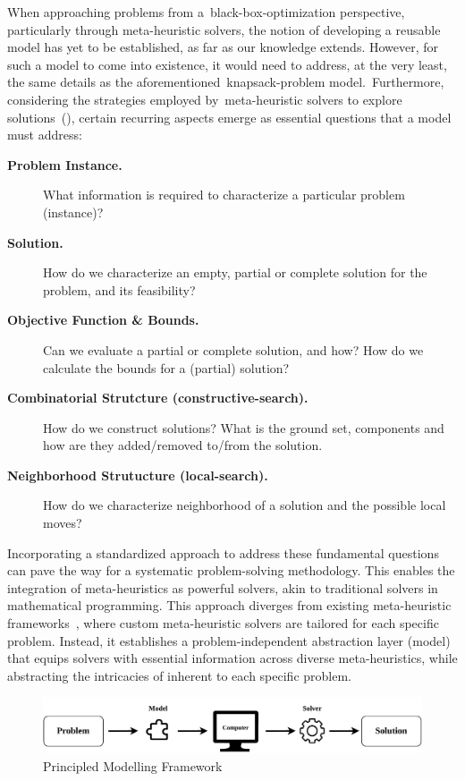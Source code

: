 When approaching problems from a~\acrshort{black-box-optimization} perspective,
particularly through \acrshort{meta-heuristic} solvers, the notion of developing
a reusable model has yet to be established, as far as our knowledge extends.
However, for such a model to come into existence, it would need to address, at
the very least, the same details as the
aforementioned~\acrshort{knapsack-problem} model.~Furthermore, considering the
strategies employed by~\acrshort{meta-heuristic} solvers to explore
solutions~(), certain recurring aspects emerge as
essential questions that a model must address:

\begin{description}
      \item[\textbf{Problem Instance.}] What information is required to characterize a particular problem (instance)?
      \item[\textbf{Solution.}] How do we characterize an empty, partial or complete solution for the problem, and its feasibility?
      \item[\textbf{Objective Function \& Bounds.}] Can we evaluate a partial or complete solution, and how? How do we calculate the bounds for a (partial) solution?
      \item[\textbf{Combinatorial Strutcture (\acrshort{constructive-search}).}] How do we construct solutions? What is the ground set, components and how are they added/removed to/from the solution.
      \item[\textbf{Neighborhood Strutucture (\acrshort{local-search}).}] How do we characterize neighborhood of a solution and the possible local moves?
\end{description}

Incorporating a standardized approach to address these fundamental questions can
pave the way for a systematic problem-solving methodology. This enables the
integration of meta-heuristics as powerful solvers, akin to traditional solvers
in mathematical programming. This approach diverges from existing meta-heuristic
frameworks~\cite{cahon2004paradiseoa,digaspero2003easylocal,durillo2011jmetal},
where custom meta-heuristic solvers are tailored for each specific problem.
Instead, it establishes a problem-independent abstraction layer (model) that
equips solvers with essential information across diverse meta-heuristics, while
abstracting the intricacies of inherent to each specific problem.

\begin{figure}[h]
      \centering
      \includegraphics[width=\textwidth,keepaspectratio]{../assets/modelling/modelling.pdf}
      \caption{Principled Modelling Framework}
      \label{fig:pmf}
\end{figure}

